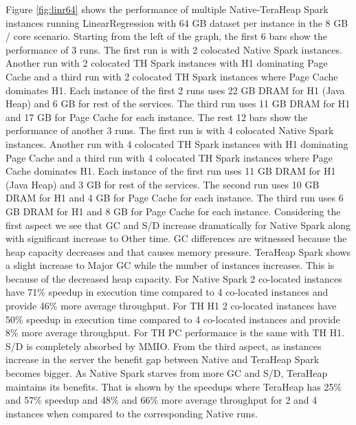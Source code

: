 Figure \ref{fig:linr64} shows the performance of multiple
Native-TeraHeap Spark instances running LinearRegression with 64 GB
dataset per instance in the 8 GB / core scenario.
Starting from the left of the graph, the first 6 bars show the
performance of 3 runs. The first run is with 2 colocated Native Spark instances.
Another run with 2 colocated TH Spark instances with H1 dominating Page Cache
and a third run with 2 colocated TH Spark instances where Page Cache dominates H1.
Each instance of the first 2 runs uses 22 GB DRAM for H1 (Java Heap) and 6 GB for rest of the services.
The third run uses 11 GB DRAM for H1 and 17 GB for Page Cache for each instance.
The rest 12 bars show the performance of another 3 runs. The first run is with 4 colocated Native Spark instances.
Another run with 4 colocated TH Spark instances with H1 dominating Page Cache
and a third run with 4 colocated TH Spark instances where Page Cache dominates H1.
Each instance of the first run uses 11 GB DRAM for H1 (Java Heap) and 3 GB for rest of the services.
The second run uses 10 GB DRAM for H1 and 4 GB for Page Cache for each instance.
The third run uses 6 GB DRAM for H1 and 8 GB for Page Cache for each instance.
Considering the first aspect we see that GC and S/D increase dramatically for Native Spark along with significant increase to Other time. GC differences are witnessed because the heap capacity decreases and that causes memory pressure. TeraHeap Spark shows a slight increase to Major GC while the number of instances increases. This is because of the decreased heap capacity. For Native Spark 2 co-located instances have 71\% speedup in execution time compared to 4 co-located instances and provide 46\% more average throughput. For TH H1 2 co-located instances have 50\% speedup in execution time compared to 4 co-located instances and provide 8\% more average throughput. For TH PC performance is the same with TH H1.
S/D is completely absorbed by MMIO. From the third aspect, as instances increase in the server the benefit gap between Native and TeraHeap Spark becomes bigger. As Native Spark starves from more GC and S/D, TeraHeap maintains its benefits. That is shown by the speedups where TeraHeap has 25\% and 57\% speedup and 48\% and 66\% more average throughput for 2 and 4 instances when compared to the corresponding Native runs.

